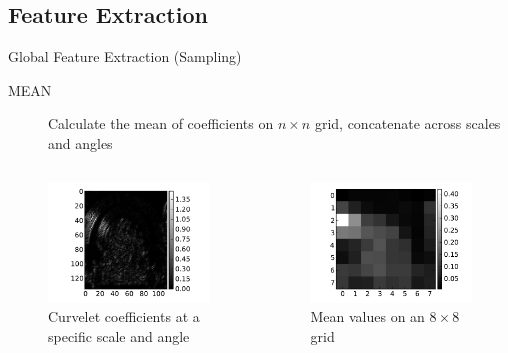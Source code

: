 \documentclass[mathserif]{beamer}
\begin{document}
\subsection{Feature Extraction}
\begin{frame}{Global Feature Extraction (Sampling)}
    \begin{description}
        \item[MEAN] Calculate the mean of coefficients on $n \times n$ grid, concatenate across scales and angles
    \end{description}
    \begin{columns}
        \begin{column}{.5\textwidth}
            \begin{figure}
                \includegraphics[width=.9\textwidth]{illustrations/signature_example_curvelet}
                \caption{Curvelet coefficients at a specific scale and angle}
            \end{figure}
        \end{column}
        \begin{column}{.5\textwidth}
            \begin{figure}
                \includegraphics[width=.9\textwidth]{illustrations/signature_example_curvelet_means}
                \caption{Mean values on an $8 \times 8$ grid}
            \end{figure}
        \end{column}
    \end{columns}
\end{frame}
\end{document}
